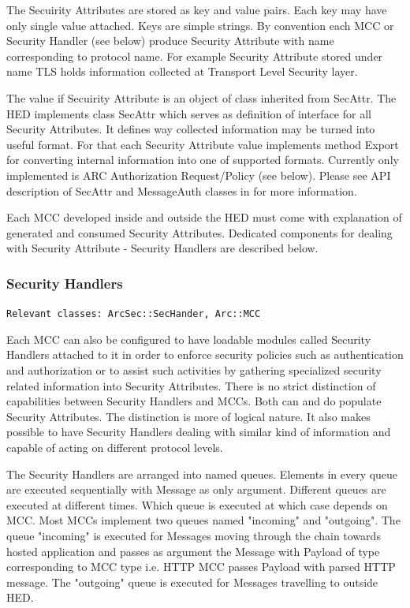 \documentclass{book}
\begin{document}
The Secuirity Attributes are stored as key and value pairs. Each key may have only single value attached. Keys are simple strings. By convention each MCC or Security Handler (see below) produce Security Attribute with name corresponding to protocol name. For example Security Attribute stored under name TLS holds information collected at Transport Level Security layer.

The value if Secuirity Attribute is an object of class inherited from SecAttr. The HED implements class SecAttr which serves as definition of interface for all Security Attributes. It defines way collected information may be turned into useful format. For that each Security Attribute value implements method Export for converting internal information into one of supported formats. Currently only implemented is ARC Authorization Request/Policy (see below). Please see API description of SecAttr and MessageAuth classes in \cite{hed-api} for more information.

Each MCC developed inside and outside the HED must come with explanation of generated and consumed Security Attributes. Dedicated components for dealing with Security Attribute - Security Handlers are described below.


\subsubsection{Security Handlers}

\texttt{Relevant classes: ArcSec::SecHander, Arc::MCC}

Each MCC can also be configured to have loadable modules called Security Handlers attached to it in order to enforce security policies such as authentication and authorization or to assist such activities by gathering specialized security related information into Security Attributes. There is no strict distinction of capabilities between Security Handlers and MCCs. Both can and do populate Security Attributes. The distinction is more of logical nature. It also makes possible to have Security Handlers dealing with similar kind of information and capable of acting on different protocol levels.

The Security Handlers are arranged into named queues. Elements in every queue are executed sequentially with Message as only argument. Different queues are executed at  different times. Which queue is executed at which case depends on MCC. Most MCCs implement two queues named "incoming" and "outgoing". The queue "incoming" is executed for Messages moving through the chain towards hosted application and passes as argument the Message with Payload of type corresponding to MCC type i.e. HTTP MCC passes Payload with parsed HTTP message. The "outgoing" queue is executed for Messages travelling to outside HED.
\end{document}
